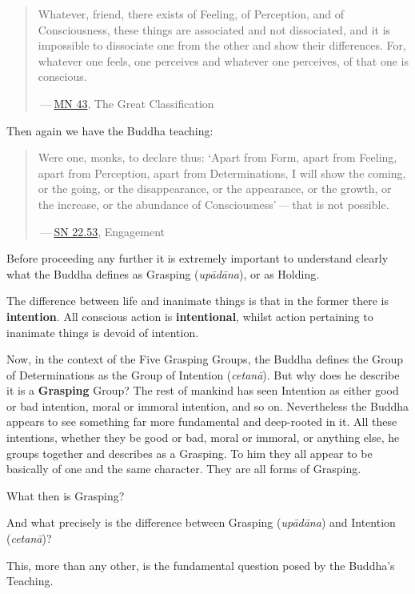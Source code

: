 \begin{quote}
Whatever, friend, there exists of Feeling, of Perception, and of Consciousness, these things are associated and not dissociated, and it is impossible to dissociate one from the other and show their differences. For, whatever one feels, one perceives and whatever one perceives, of that one is conscious.

 --- \href{https://suttacentral.net/mn43/en/sujato}{MN 43}, The Great Classification
\end{quote}

Then again we have the Buddha teaching:

\begin{quote}
Were one, monks, to declare thus: `Apart from Form, apart from Feeling, apart from Perception, apart from Determinations, I will show the coming, or the going, or the disappearance, or the appearance, or the growth, or the increase, or the abundance of Consciousness' --- that is not possible.

 --- \href{https://suttacentral.net/sn22.53/en/bodhi}{SN 22.53}, Engagement
\end{quote}

Before proceeding any further it is extremely important to understand clearly what the Buddha defines as Grasping (\emph{upādāna}), or as Holding.

The difference between life and inanimate things is that in the former there is \textbf{intention}. All conscious action is \textbf{intentional}, whilst action pertaining to inanimate things is devoid of intention.

Now, in the context of the Five Grasping Groups, the Buddha defines the Group of Determinations as the Group of Intention (\emph{cetanā}). But why does he describe it is a \textbf{Grasping} Group? The rest of mankind has seen Intention as either good or bad intention, moral or immoral intention, and so on. Nevertheless the Buddha appears to see something far more fundamental and deep-rooted in it. All these intentions, whether they be good or bad, moral or immoral, or anything else, he groups together and describes as a Grasping. To him they all appear to be basically of one and the same character. They are all forms of Grasping.

What then is Grasping?

And what precisely is the difference between Grasping (\emph{upādāna}) and Intention (\emph{cetanā})?

This, more than any other, is the fundamental question posed by the Buddha's Teaching.

